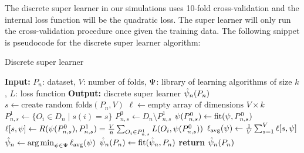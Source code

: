 \documentclass[./main.tex]{subfiles}
\begin{document}
The discrete super learner in our simulations uses 10-fold cross-validation and the internal loss function will be the quadratic loss. The super learner will only run the cross-validation procedure once given the training data. The following snippet is pseudocode for the discrete super learner algorithm:
\begin{algorithm}[H]
\caption{Discrete super learner}
\begin{algorithmic}[1]
\State \textbf{Input:} $P_n$: dataset, $V$: number of folds, $ \Psi $: library of learning algorithms of size $ k $, $ L $: loss function
\State \textbf{Output:} discrete super learner $ \hat{\psi}_n(P_n) $
\State $s \gets \text{create random folds}(P_n, V)$ 
\State $\ell \gets \text{empty array of dimensions } V \times k$  
    \State $P_{n, s}^{1} \gets \{O_i \in D_n \mid s(i) = s\} $
    \State $P_{n, s}^{0} \gets D_n \setminus P_{n,s}^{1} $
    \For{$\la \in \lib$}
    \State $ \psi(P_{n,s}^{0}) \gets \text{fit}(\psi, P_{n, s}^{0})$
    \State $\ell[s,\psi] \gets R(\psi(P_{n, s}^{0}), P_{n,s}^{1}) = \frac{V}{n} \sum_{O_i \in P_{n,s}^{1}} L(O_i, \psi(P_{n, s}^{0})) $
    \EndFor
\EndFor
\For{$\la \in \lib$}
    \State $ \ell_{\text{avg}}(\psi) \gets \frac{1}{V} \sum_{s = 1}^{V} \ell[s,\psi] $ 
\EndFor
\State $ \hat{\psi}_n \gets \operatorname*{arg\,min}_{\psi \in \Psi} \ell_{\text{avg}}(\psi) $
\State $ \hat{\psi}_n(P_n) \gets \text{fit}(\hat{\psi}_n, P_n) $  
\State \textbf{return} $ \hat{\psi}_n(P_n) $
\end{algorithmic}
\end{algorithm}
\end{document}
